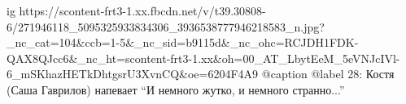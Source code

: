  
 
 
 
 

\ifcmt
  ig https://scontent-frt3-1.xx.fbcdn.net/v/t39.30808-6/271946118_5095325933834306_3936538777946218583_n.jpg?_nc_cat=104&ccb=1-5&_nc_sid=b9115d&_nc_ohc=RCJDH1FDK-QAX8QJcc6&_nc_ht=scontent-frt3-1.xx&oh=00_AT_LbytEeM_5eVNJcIVl-6_mSKhazHETkDhtgsrU3XvnCQ&oe=6204F4A9
  @caption @label 28: Костя (Саша Гаврилов) напевает \enquote{И немного жутко, и немного странно...}
\fi

